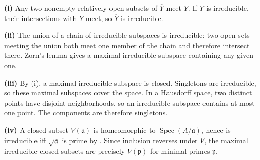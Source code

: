 \textbf{(i)} Any two nonempty relatively open subsets of $\overline Y$ meet $Y$. If $Y$ is irreducible, their intersections with $Y$ meet, so $\overline Y$ is irreducible.

\textbf{(ii)} The union of a chain of irreducible subspaces is irreducible: two open sets meeting the union both meet one member of the chain and therefore intersect there. Zorn's lemma gives a maximal irreducible subspace containing any given one.

\textbf{(iii)} By (i), a maximal irreducible subspace is closed. Singletons are irreducible, so these maximal subspaces cover the space. In a Hausdorff space, two distinct points have disjoint neighborhoods, so an irreducible subspace contains at most one point. The components are therefore singletons.

\textbf{(iv)} A closed subset $V(\mathfrak a)$ is homeomorphic to $\operatorname{Spec}(A/\mathfrak a)$, hence is irreducible iff $\sqrt{\mathfrak a}$ is prime by . Since inclusion reverses under $V$, the maximal irreducible closed subsets are precisely $V(\mathfrak p)$ for minimal primes $\mathfrak p$.
